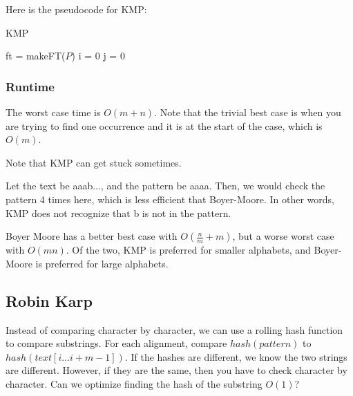 \documentclass[a4paper]{article}
\begin{document}

Here is the pseudocode for KMP:

\begin{algorithm}[H]
	\caption{KMP}
	ft = makeFT(\( P \))\;
	i = 0\;
	j = 0\;
\end{algorithm}

\subsubsection{Runtime}

The worst case time is \( O(m+n) \). Note that the trivial best case is when you are trying to find one occurrence and it is at the start of the case, which is \( O(m) \).

\begin{note}
	Note that KMP can get stuck sometimes.
\end{note}

\begin{eg}
	Let the text be aaab..., and the pattern be aaaa. Then, we would check the pattern 4 times here, which is less efficient that Boyer-Moore. In other words, KMP does not recognize that b is not in the pattern.
\end{eg}

\begin{note}
	Boyer Moore has a better best case with \( O(\frac{n}{m} + m) \), but a worse worst case with \( O(mn) \). Of the two, KMP is preferred for smaller alphabets, and Boyer-Moore is preferred for large alphabets.
\end{note}


\subsection{Robin Karp}

Instead of comparing character by character, we can use a rolling hash function to compare substrings. For each alignment, compare \( hash(pattern) \) to \( hash(text[i\ldots i+m-1]) \). If the hashes are different, we know the two strings are different. However, if they are the same, then you have to check character by character. Can we optimize finding the hash of the substring \( O(1) \)?
\end{document}
